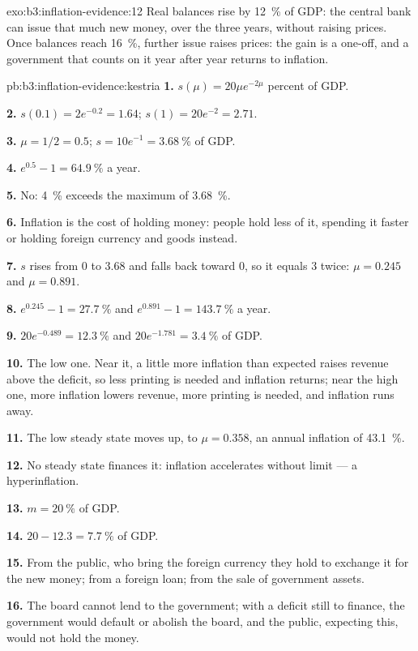 \begin{solution}{exo:b3:inflation-evidence:12}
Real balances rise by 12~\% of GDP: the central bank can issue that much new money,
over the three years, without raising prices. Once balances reach 16~\%, further
issue raises prices: the gain is a one-off, and a government that counts on it
year after year returns to inflation.
\end{solution}

\begin{solution}{pb:b3:inflation-evidence:kestria}
\textbf{1.} $s(\mu) = 20\mu e^{-2\mu}$ percent of GDP. %

\textbf{2.} $s(0.1) = 2e^{-0.2} = 1.64$; $s(1) = 20e^{-2} = 2.71$.

\textbf{3.} $\mu = 1/2 = 0.5$; $s = 10e^{-1} = 3.68~\%$ of GDP.

\textbf{4.} $e^{0.5} - 1 = 64.9~\%$ a year.

\textbf{5.} No: 4~\% exceeds the maximum of 3.68~\%.

\textbf{6.} Inflation is the cost of holding money: people hold less of it,
spending it faster or holding foreign currency and goods instead.

\textbf{7.} $s$ rises from 0 to 3.68 and falls back toward 0, so it equals 3 twice:
$\mu = 0.245$ and $\mu = 0.891$.

\textbf{8.} $e^{0.245} - 1 = 27.7~\%$ and $e^{0.891} - 1 = 143.7~\%$ a year.

\textbf{9.} $20e^{-0.489} = 12.3~\%$ and $20e^{-1.781} = 3.4~\%$ of GDP.

\textbf{10.} The low one. Near it, a little more inflation than expected raises
revenue above the deficit, so less printing is needed and inflation returns;
near the high one, more inflation lowers revenue, more printing is needed, and
inflation runs away.

\textbf{11.} The low steady state moves up, to $\mu = 0.358$, an annual inflation of 43.1~\%.

\textbf{12.} No steady state finances it: inflation accelerates without limit --- a
hyperinflation.

\textbf{13.} $m = 20~\%$ of GDP.

\textbf{14.} $20 - 12.3 = 7.7~\%$ of GDP.

\textbf{15.} From the public, who bring the foreign currency they hold to exchange it
for the new money; from a foreign loan; from the sale of government assets.

\textbf{16.} The board cannot lend to the government; with a deficit still to finance,
the government would default or abolish the board, and the public, expecting
this, would not hold the money.


\end{solution}
